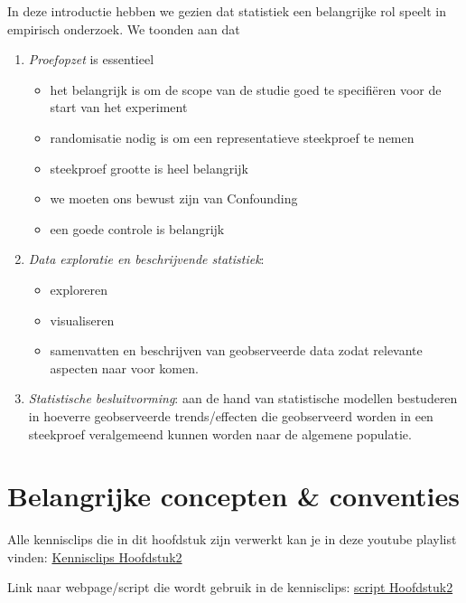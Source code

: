 \documentclass[
  12pt,dutch,coursenotes]{book}
\providecommand{\tightlist}{%
  \setlength{\itemsep}{0pt}\setlength{\parskip}{0pt}}
\begin{document}
In deze introductie hebben we gezien dat statistiek een belangrijke rol speelt in empirisch onderzoek. We toonden aan dat

\begin{enumerate}
\def\labelenumi{\arabic{enumi}.}
\item
  \emph{Proefopzet} is essentieel

  \begin{itemize}
  \item
    het belangrijk is om de scope van de studie goed te specifiëren voor de start van het experiment
  \item
    randomisatie nodig is om een representatieve steekproef te nemen
  \item
    steekproef grootte is heel belangrijk
  \item
    we moeten ons bewust zijn van Confounding
  \item
    een goede controle is belangrijk
  \end{itemize}
\item
  \emph{Data exploratie en beschrijvende statistiek}:

  \begin{itemize}
  \tightlist
  \item
    exploreren
  \item
    visualiseren
  \item
    samenvatten en beschrijven van geobserveerde data zodat relevante aspecten naar voor komen.
  \end{itemize}
\item
  \emph{Statistische besluitvorming}: aan de hand van statistische modellen bestuderen in hoeverre geobserveerde trends/effecten die geobserveerd worden in een steekproef veralgemeend kunnen worden naar de algemene populatie.
\end{enumerate}

\hypertarget{belangrijke-concepten-conventies}{%
\chapter{Belangrijke concepten \& conventies}\label{belangrijke-concepten-conventies}}

Alle kennisclips die in dit hoofdstuk zijn verwerkt kan je in deze youtube playlist vinden: \href{https://www.youtube.com/playlist?list=PLZH1hP8_LbJJ7apU5sAbRlUsve2nWz5ev}{Kennisclips Hoofdstuk2}

Link naar webpage/script die wordt gebruik in de kennisclips: \href{https://statomics.github.io/sbc21/rmd/02-concepts.html}{script Hoofdstuk2}
\end{document}
